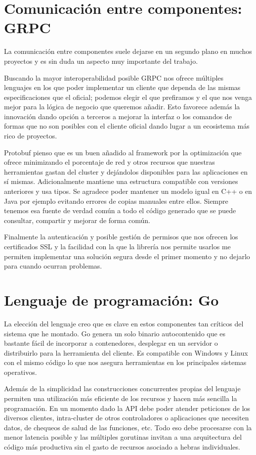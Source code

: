 \section{Comunicación entre componentes: GRPC}

La comunicación entre componentes suele dejarse en un segundo plano en muchos proyectos y es sin duda un aspecto muy importante del trabajo.

Buscando la mayor interoperabilidad posible GRPC nos ofrece múltiples lenguajes en los que poder implementar un cliente que dependa de las mismas especificaciones que el oficial; podemos elegir el que prefiramos y el que nos venga mejor para la lógica de negocio que queremos añadir. Esto favorece además la innovación dando opción a terceros a mejorar la interfaz o los comandos de formas que no son posibles con el cliente oficial dando lugar a un ecosistema más rico de proyectos.

Protobuf pienso que es un buen añadido al framework por la optimización que ofrece minimizando el porcentaje de red y otros recursos que nuestras herramientas gastan del cluster y dejándolos disponibles para las aplicaciones en sí mismas. Adicionalmente mantiene una estructura compatible con versiones anteriores y usa tipos. Se agradece poder mantener un modelo igual en C++ o en Java por ejemplo evitando errores de copias manuales entre ellos. Siempre tenemos esa fuente de verdad común a todo el código generado que se puede consultar, compartir y mejorar de forma común.

Finalmente la autenticación y posible gestión de permisos que nos ofrecen los certificados SSL y la facilidad con la que la librería nos permite usarlos me permiten implementar una solución segura desde el primer momento y no dejarlo para cuando ocurran problemas.

\section{Lenguaje de programación: Go}

La elección del lenguaje creo que es clave en estos componentes tan críticos del sistema que he montado. Go genera un solo binario autocontenido que es bastante fácil de incorporar a contenedores, desplegar en un servidor o distribuirlo para la herramienta del cliente. Es compatible con Windows y Linux con el mismo código lo que nos asegura herramientas en los principales sistemas operativos.

Además de la simplicidad las construcciones concurrentes propias del lenguaje permiten una utilización más eficiente de los recursos y hacen más sencilla la programación. En un momento dado la API debe poder atender peticiones de los diversos clientes, intra-cluster de otros controladores o aplicaciones que necesiten datos, de chequeos de salud de las funciones, etc. Todo eso debe procesarse con la menor latencia posible y las múltiples gorutinas invitan a una arquitectura del código más productiva sin el gasto de recursos asociado a hebras individuales.

